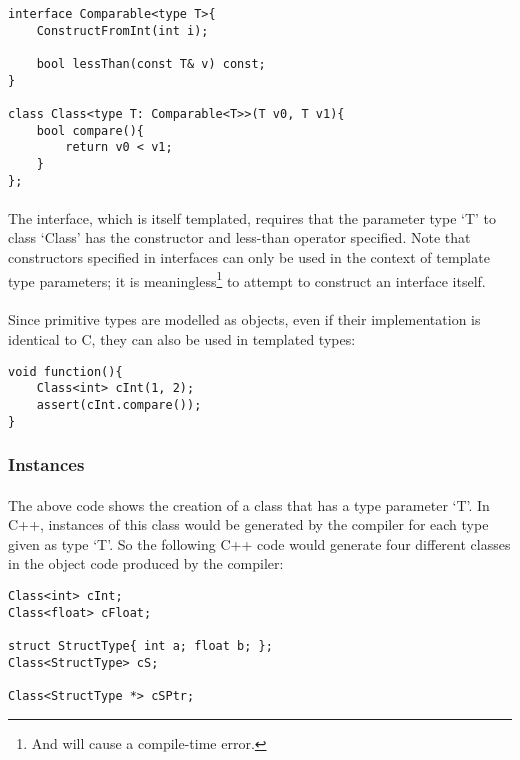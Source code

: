 \documentclass[12pt,twoside,notitlepage]{report}
\begin{document}
\small{
\begin{verbatim}
interface Comparable<type T>{
    ConstructFromInt(int i);

    bool lessThan(const T& v) const;
}

class Class<type T: Comparable<T>>(T v0, T v1){
    bool compare(){
        return v0 < v1;
    }
};
\end{verbatim}
}

\paragraph{}
The interface, which is itself templated, requires that the parameter type `T' to class `Class' has the constructor and less-than operator specified. Note that constructors specified in interfaces can only be used in the context of template type parameters; it is meaningless\footnote{And will cause a compile-time error.} to attempt to construct an interface itself.

\paragraph{}
Since primitive types are modelled as objects, even if their implementation is identical to C, they can also be used in templated types:

\small{
\begin{verbatim}
void function(){
    Class<int> cInt(1, 2);
    assert(cInt.compare());
}
\end{verbatim}
}

\subsubsection{Instances}

\paragraph{}
The above code shows the creation of a class that has a type parameter `T'. In C++, instances of this class would be generated by the compiler for each type given as type `T'. So the following C++ code would generate four different classes in the object code produced by the compiler:

\small{
\begin{verbatim}
Class<int> cInt;
Class<float> cFloat;

struct StructType{ int a; float b; };
Class<StructType> cS;

Class<StructType *> cSPtr;
\end{verbatim}
}
\end{document}

